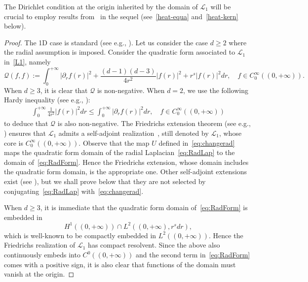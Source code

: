 \documentclass[%
11pt,  reqno]{amsart}
\theoremstyle{remarkstyle}
\newcommand{\1}{\hspace{0.2mm}\text{I}\hspace{0.2mm}}
\renewcommand{\L}{\mathcal{L}}
\numberwithin{equation}{section}
\numberwithin{theorem}{section}
\begin{document}
	The Dirichlet condition at the origin inherited by the domain of $\L_1$ will be crucial to employ results from~\cite{OW18} in the sequel (see~\eqref{heat-equa} and~\eqref{heat-kern} below).
	
	\begin{proof}
		The 1D case is standard (see e.g., \cite[Theorem 3.1]{BS12}). Let us consider the case $d\geq 2$ where the radial assumption is imposed.
		Consider the quadratic form associated to $\L_1$ in~\eqref{L1}, namely
		\begin{equation}\label{eq:RadForm}
			\mathcal Q(f,f) := \int_0^{+\infty} |\partial_r f(r)|^2 + \frac{(d-1)(d-3)}{4r^2} |f(r)|^2 + r^s |f(r)|^2 dr, \quad f \in C^\infty_0((0,+\infty)).
		\end{equation}
		When $d\geq 3$, it is clear that $\mathcal Q$ is non-negative. When $d=2$, we use the following Hardy inequality (see e.g., \cite{Davies99}):
		\begin{align} \label{Hardy-ineq}
			\int_0^{+\infty} \frac{1}{4r^2} |f(r)|^2 dr \leq \int_0^{+\infty} |\partial_r f(r)|^2 dr, \quad f\in C^\infty_0((0,+\infty))
		\end{align}
		to deduce that $\mathcal Q$ is also non-negative. The Friedrichs extension theorem (see e.g., \cite[Theorem X.23]{RS75}) ensures that $\L_1$ admits a self-adjoint realization~\cite{OW18}, still denoted by $\L_1$, whose core is $C^\infty_0((0,+\infty))$. Observe that the map $U$ defined in~\eqref{eq:changerad} maps the quadratic form domain of the radial Laplacian~\eqref{eq:RadLap} to the domain of~\eqref{eq:RadForm}. Hence the Friedrichs extension, whose domain includes the quadratic form domain, is the appropriate one. Other self-adjoint extensions exist (see \cite{BDG11}), but we shall prove below that they are not selected by conjugating~\eqref{eq:RadLap} with~\eqref{eq:changerad}.
		
		When $d\geq 3$, it is immediate that the quadratic form domain of~\eqref{eq:RadForm} is embedded in
		$$ H^1 ((0,+\infty)) \cap  L^2 ((0,+\infty),r^s dr),$$
		which is well-known to be compactly embedded in $L^2((0,+\infty))$. Hence the Friedrichs realization of $\L_1$ has compact resolvent. Since the above also continuously embeds into $C^0 ((0,+\infty))$ and  the second term in~\eqref{eq:RadForm} comes with a positive sign, it is also clear that functions of the domain must vanish at the origin.
		

\end{proof}
\end{document}
